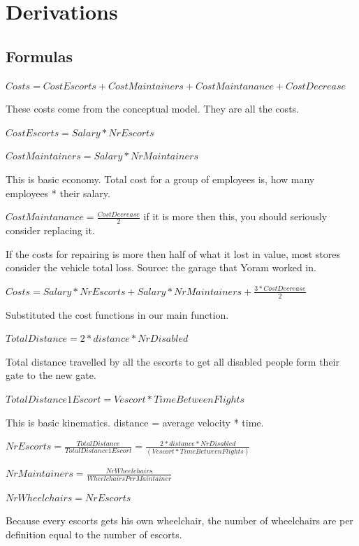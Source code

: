 \documentclass[a4paper, 11pt, notitlepage]{report}
\begin{document}
\chapter{Derivations}
	\section{Formulas}
\begin{description}
	\item $Costs = CostEscorts + CostMaintainers + CostMaintanance + CostDecrease$
	\item[Explanation:] These costs come from the conceptual model. They are all the costs.
	\item $CostEscorts = Salary * NrEscorts$
	\item $CostMaintainers = Salary * NrMaintainers$
	\item[Explanation:] This is basic economy. Total cost for a group of employees is, how many employees * their salary.
	\item $CostMaintanance = \frac{CostDecrease}{2} $ if it is more then this, you should seriously consider replacing it.
	\item[Explanation:] If the costs for repairing is more then half of what it lost in value, most stores consider the vehicle total loss. Source: the garage that Yoram worked in.
	\item
	\item $Costs = Salary * NrEscorts + Salary * NrMaintainers + \frac{3* CostDecrease}{2}$
	\item[Explanation:] Substituted the cost functions in our main function.
	\item $TotalDistance = 2*distance*NrDisabled$
	\item[Explanation:] Total distance travelled by all the escorts to get all disabled people form their gate to the new gate.
	\item $TotalDistance1Escort = Vescort*TimeBetweenFlights$
	\item[Explanation:] This is basic kinematics. distance = average velocity * time.
	\item $NrEscorts = \frac{TotalDistance}{TotalDistance1Escort} = \frac{2*distance*NrDisabled}{(Vescort*TimeBetweenFlights)}$
	\item
	\item $NrMaintainers = \frac{NrWheelchairs}{WheelchairsPerMaintainer}$
	\item $NrWheelchairs = NrEscorts$
	\item[Explanation:] Because every escorts gets his own wheelchair, the number of wheelchairs are per definition equal to the number of escorts.

\end{description}
\end{document}
